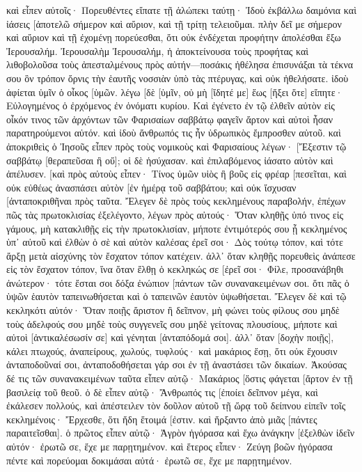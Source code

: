 καὶ εἶπεν αὐτοῖς· Πορευθέντες εἴπατε τῇ ἀλώπεκι ταύτῃ· Ἰδοὺ ἐκβάλλω δαιμόνια καὶ ἰάσεις [ἀποτελῶ σήμερον καὶ αὔριον, καὶ τῇ τρίτῃ τελειοῦμαι. 
πλὴν δεῖ με σήμερον καὶ αὔριον καὶ τῇ ἐχομένῃ πορεύεσθαι, ὅτι οὐκ ἐνδέχεται προφήτην ἀπολέσθαι ἔξω Ἰερουσαλήμ. 
Ἰερουσαλὴμ Ἰερουσαλήμ, ἡ ἀποκτείνουσα τοὺς προφήτας καὶ λιθοβολοῦσα τοὺς ἀπεσταλμένους πρὸς αὐτήν—ποσάκις ἠθέλησα ἐπισυνάξαι τὰ τέκνα σου ὃν τρόπον ὄρνις τὴν ἑαυτῆς νοσσιὰν ὑπὸ τὰς πτέρυγας, καὶ οὐκ ἠθελήσατε. 
ἰδοὺ ἀφίεται ὑμῖν ὁ οἶκος [ὑμῶν. λέγω [δὲ [ὑμῖν, οὐ μὴ [ἴδητέ με] ἕως [ἥξει ὅτε] εἴπητε· Εὐλογημένος ὁ ἐρχόμενος ἐν ὀνόματι κυρίου. 
Καὶ ἐγένετο ἐν τῷ ἐλθεῖν αὐτὸν εἰς οἶκόν τινος τῶν ἀρχόντων τῶν Φαρισαίων σαββάτῳ φαγεῖν ἄρτον καὶ αὐτοὶ ἦσαν παρατηρούμενοι αὐτόν. 
καὶ ἰδοὺ ἄνθρωπός τις ἦν ὑδρωπικὸς ἔμπροσθεν αὐτοῦ. 
καὶ ἀποκριθεὶς ὁ Ἰησοῦς εἶπεν πρὸς τοὺς νομικοὺς καὶ Φαρισαίους λέγων· [Ἔξεστιν τῷ σαββάτῳ [θεραπεῦσαι ἢ οὔ]; 
οἱ δὲ ἡσύχασαν. καὶ ἐπιλαβόμενος ἰάσατο αὐτὸν καὶ ἀπέλυσεν. 
[καὶ πρὸς αὐτοὺς εἶπεν· Τίνος ὑμῶν υἱὸς ἢ βοῦς εἰς φρέαρ [πεσεῖται, καὶ οὐκ εὐθέως ἀνασπάσει αὐτὸν [ἐν ἡμέρᾳ τοῦ σαββάτου; 
καὶ οὐκ ἴσχυσαν [ἀνταποκριθῆναι πρὸς ταῦτα. 
Ἔλεγεν δὲ πρὸς τοὺς κεκλημένους παραβολήν, ἐπέχων πῶς τὰς πρωτοκλισίας ἐξελέγοντο, λέγων πρὸς αὐτούς· 
Ὅταν κληθῇς ὑπό τινος εἰς γάμους, μὴ κατακλιθῇς εἰς τὴν πρωτοκλισίαν, μήποτε ἐντιμότερός σου ᾖ κεκλημένος ὑπ᾽ αὐτοῦ 
καὶ ἐλθὼν ὁ σὲ καὶ αὐτὸν καλέσας ἐρεῖ σοι· Δὸς τούτῳ τόπον, καὶ τότε ἄρξῃ μετὰ αἰσχύνης τὸν ἔσχατον τόπον κατέχειν. 
ἀλλ᾽ ὅταν κληθῇς πορευθεὶς ἀνάπεσε εἰς τὸν ἔσχατον τόπον, ἵνα ὅταν ἔλθῃ ὁ κεκληκώς σε [ἐρεῖ σοι· Φίλε, προσανάβηθι ἀνώτερον· τότε ἔσται σοι δόξα ἐνώπιον [πάντων τῶν συνανακειμένων σοι. 
ὅτι πᾶς ὁ ὑψῶν ἑαυτὸν ταπεινωθήσεται καὶ ὁ ταπεινῶν ἑαυτὸν ὑψωθήσεται. 
Ἔλεγεν δὲ καὶ τῷ κεκληκότι αὐτόν· Ὅταν ποιῇς ἄριστον ἢ δεῖπνον, μὴ φώνει τοὺς φίλους σου μηδὲ τοὺς ἀδελφούς σου μηδὲ τοὺς συγγενεῖς σου μηδὲ γείτονας πλουσίους, μήποτε καὶ αὐτοὶ [ἀντικαλέσωσίν σε] καὶ γένηται [ἀνταπόδομά σοι]. 
ἀλλ᾽ ὅταν [δοχὴν ποιῇς], κάλει πτωχούς, ἀναπείρους, χωλούς, τυφλούς· 
καὶ μακάριος ἔσῃ, ὅτι οὐκ ἔχουσιν ἀνταποδοῦναί σοι, ἀνταποδοθήσεται γάρ σοι ἐν τῇ ἀναστάσει τῶν δικαίων. 
Ἀκούσας δέ τις τῶν συνανακειμένων ταῦτα εἶπεν αὐτῷ· Μακάριος [ὅστις φάγεται [ἄρτον ἐν τῇ βασιλείᾳ τοῦ θεοῦ. 
ὁ δὲ εἶπεν αὐτῷ· Ἄνθρωπός τις [ἐποίει δεῖπνον μέγα, καὶ ἐκάλεσεν πολλούς, 
καὶ ἀπέστειλεν τὸν δοῦλον αὐτοῦ τῇ ὥρᾳ τοῦ δείπνου εἰπεῖν τοῖς κεκλημένοις· Ἔρχεσθε, ὅτι ἤδη ἕτοιμά [ἐστιν. 
καὶ ἤρξαντο ἀπὸ μιᾶς [πάντες παραιτεῖσθαι]. ὁ πρῶτος εἶπεν αὐτῷ· Ἀγρὸν ἠγόρασα καὶ ἔχω ἀνάγκην [ἐξελθὼν ἰδεῖν αὐτόν· ἐρωτῶ σε, ἔχε με παρῃτημένον. 
καὶ ἕτερος εἶπεν· Ζεύγη βοῶν ἠγόρασα πέντε καὶ πορεύομαι δοκιμάσαι αὐτά· ἐρωτῶ σε, ἔχε με παρῃτημένον. 
